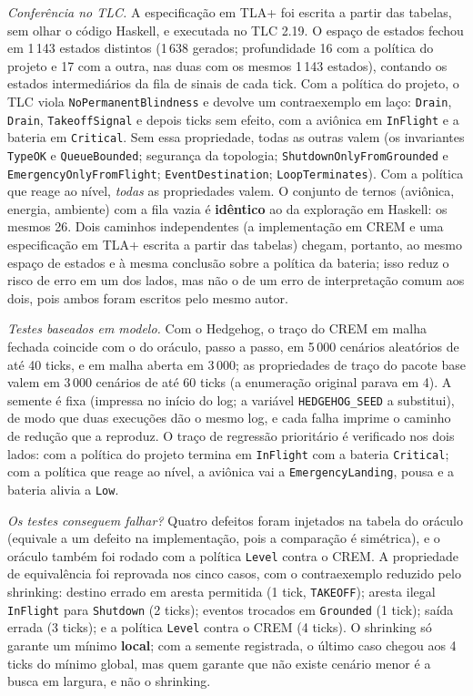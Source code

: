 \documentclass[12pt,a4paper]{article}
\begin{document}
\textit{Conferência no TLC.} A especificação em TLA+ foi escrita a partir das tabelas, sem olhar o código Haskell, e executada no TLC 2.19. O espaço de estados fechou em 1\,143 estados distintos (1\,638 gerados; profundidade 16 com a política do projeto e 17 com a outra, nas duas com os mesmos 1\,143 estados), contando os estados intermediários da fila de sinais de cada tick. Com a política do projeto, o TLC viola \texttt{NoPermanentBlindness} e devolve um contraexemplo em laço: \texttt{Drain}, \texttt{Drain}, \texttt{TakeoffSignal} e depois ticks sem efeito, com a aviônica em \texttt{InFlight} e a bateria em \texttt{Critical}. Sem essa propriedade, todas as outras valem (os invariantes \texttt{TypeOK} e \texttt{QueueBounded}; segurança da topologia; \texttt{ShutdownOnlyFromGrounded} e \texttt{EmergencyOnlyFromFlight}; \texttt{EventDestination}; \texttt{LoopTerminates}). Com a política que reage ao nível, \emph{todas} as propriedades valem. O conjunto de ternos (aviônica, energia, ambiente) com a fila vazia é \textbf{idêntico} ao da exploração em Haskell: os mesmos 26. Dois caminhos independentes (a implementação em CREM e uma especificação em TLA+ escrita a partir das tabelas) chegam, portanto, ao mesmo espaço de estados e à mesma conclusão sobre a política da bateria; isso reduz o risco de erro em um dos lados, mas não o de um erro de interpretação comum aos dois, pois ambos foram escritos pelo mesmo autor.

\textit{Testes baseados em modelo.} Com o Hedgehog, o traço do CREM em malha fechada coincide com o do oráculo, passo a passo, em 5\,000 cenários aleatórios de até 40 ticks, e em malha aberta em 3\,000; as propriedades de traço do pacote base valem em 3\,000 cenários de até 60 ticks (a enumeração original parava em 4). A semente é fixa (impressa no início do log; a variável \texttt{HEDGEHOG\_SEED} a substitui), de modo que duas execuções dão o mesmo log, e cada falha imprime o caminho de redução que a reproduz. O traço de regressão prioritário é verificado nos dois lados: com a política do projeto termina em \texttt{InFlight} com a bateria \texttt{Critical}; com a política que reage ao nível, a aviônica vai a \texttt{EmergencyLanding}, pousa e a bateria alivia a \texttt{Low}.

\textit{Os testes conseguem falhar?} Quatro defeitos foram injetados na tabela do oráculo (equivale a um defeito na implementação, pois a comparação é simétrica), e o oráculo também foi rodado com a política \texttt{Level} contra o CREM. A propriedade de equivalência foi reprovada nos cinco casos, com o contraexemplo reduzido pelo shrinking: destino errado em aresta permitida (1 tick, \texttt{TAKEOFF}); aresta ilegal \texttt{InFlight} para \texttt{Shutdown} (2 ticks); eventos trocados em \texttt{Grounded} (1 tick); saída errada (3 ticks); e a política \texttt{Level} contra o CREM (4 ticks). O shrinking só garante um mínimo \textbf{local}; com a semente registrada, o último caso chegou aos 4 ticks do mínimo global, mas quem garante que não existe cenário menor é a busca em largura, e não o shrinking.
\end{document}
